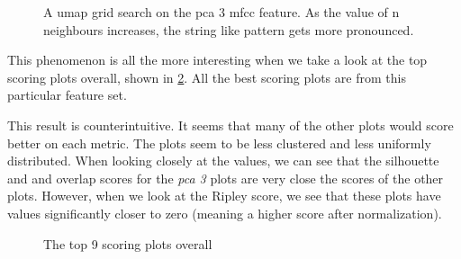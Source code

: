 \documentclass[11pt]{article}
\begin{document}
\begin{figure}[h!tbp]
\centering
{}
\caption{A umap grid search on the pca 3 mfcc feature. As the value of n neighbours increases, the string like pattern gets more pronounced.}
\label{fig:umap_3d_pca_grid_search}
\end{figure}

This phenomenon is all the more interesting when we take a look at the top scoring plots overall, shown in \ref{fig:top_overall}. All the best scoring plots are from this particular feature set.

This result is counterintuitive. It seems that many of the other plots would score better on each metric. The plots seem to be less clustered and less uniformly distributed. When looking closely at the values, we can see that the silhouette and and overlap scores for the \textit{pca 3} plots are very close the scores of the other plots. However, when we look at the Ripley score, we see that these plots have values significantly closer to zero (meaning a higher score after normalization).

\begin{figure}[htbp]
\centering
{}
\caption{The top 9 scoring plots overall}
\label{fig:top_overall}
\end{figure}
\end{document}
